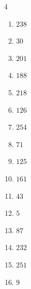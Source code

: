 \begin{multicols}{4}
\begin{enumerate}
  \item $238$


  \item $30$


  \item $201$


  \item $188$


  \item $218$


  \item $126$


  \item $254$


  \item $71$


  \item $125$


\columnbreak %

  \item $161$


  \item $43$


  \item $5$


  \item $87$


  \item $232$


  \item $251$


  \item $9$


\end{enumerate}
\end{multicols}
